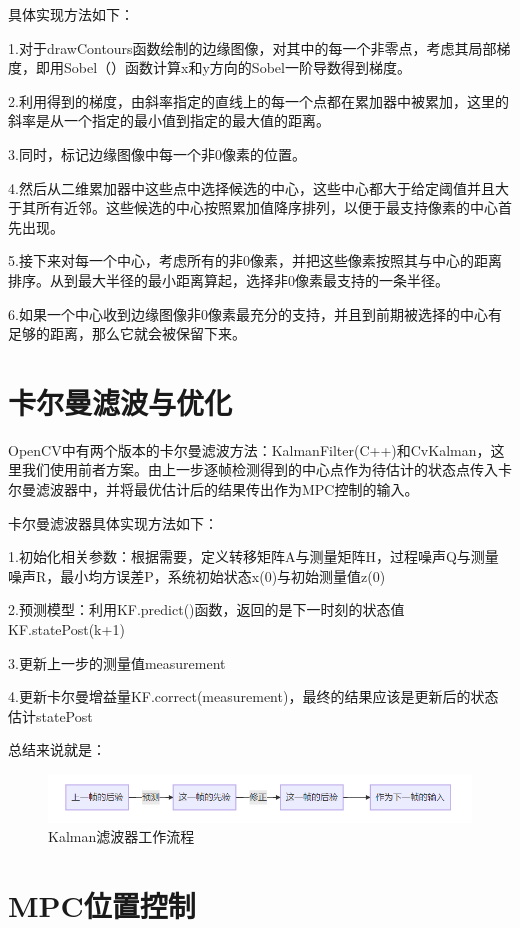 具体实现方法如下：

1.对于drawContours函数绘制的边缘图像，对其中的每一个非零点，考虑其局部梯度，即用Sobel（）函数计算x和y方向的Sobel⼀阶导数得到梯度。

2.利用得到的梯度，由斜率指定的直线上的每一个点都在累加器中被累加，这⾥的斜率是从一个指定的最小值到指定的最大值的距离。

3.同时，标记边缘图像中每一个非0像素的位置。

4.然后从二维累加器中这些点中选择候选的中心，这些中心都大于给定阈值并且大于其所有近邻。这些候选的中心按照累加值降序排列，以便于最支持像素的中心首先出现。

5.接下来对每⼀个中心，考虑所有的非0像素，并把这些像素按照其与中心的距离排序。从到最大半径的最小距离算起，选择非0像素最支持的⼀条半径。

6.如果⼀个中心收到边缘图像⾮0像素最充分的支持，并且到前期被选择的中心有足够的距离，那么它就会被保留下来。

\section{卡尔曼滤波与优化}

OpenCV中有两个版本的卡尔曼滤波方法：KalmanFilter(C++)和CvKalman，这里我们使用前者方案。由上一步逐帧检测得到的中心点作为待估计的状态点传入卡尔曼滤波器中，并将最优估计后的结果传出作为MPC控制的输入。

卡尔曼滤波器具体实现方法如下：

1.初始化相关参数：根据需要，定义转移矩阵A与测量矩阵H，过程噪声Q与测量噪声R，最小均方误差P，系统初始状态x(0)与初始测量值z(0)

2.预测模型：利用KF.predict()函数，返回的是下一时刻的状态值KF.statePost(k+1)

3.更新上一步的测量值measurement

4.更新卡尔曼增益量KF.correct(measurement)，最终的结果应该是更新后的状态估计statePost

总结来说就是：

\begin{figure}[ht]
  \centering
  \includegraphics[width=0.8\linewidth]{./Figure/Kalman_Process.png}
  \caption{Kalman滤波器工作流程}\label{Fig:xd1}
\end{figure}

\section{MPC位置控制}

